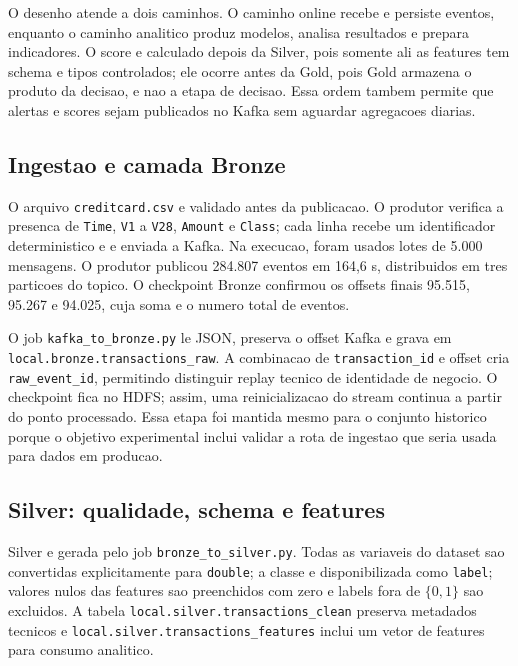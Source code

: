 \documentclass[10pt,twocolumn]{article}
\begin{document}
O desenho atende a dois caminhos. O caminho online recebe e persiste eventos, enquanto o caminho analitico produz modelos, analisa resultados e prepara indicadores. O score e calculado depois da Silver, pois somente ali as features tem schema e tipos controlados; ele ocorre antes da Gold, pois Gold armazena o produto da decisao, e nao a etapa de decisao. Essa ordem tambem permite que alertas e scores sejam publicados no Kafka sem aguardar agregacoes diarias.

\subsection{Ingestao e camada Bronze}

O arquivo \texttt{creditcard.csv} e validado antes da publicacao. O produtor verifica a presenca de \texttt{Time}, \texttt{V1} a \texttt{V28}, \texttt{Amount} e \texttt{Class}; cada linha recebe um identificador deterministico e e enviada a Kafka. Na execucao, foram usados lotes de 5.000 mensagens. O produtor publicou 284.807 eventos em 164,6 s, distribuidos em tres particoes do topico. O checkpoint Bronze confirmou os offsets finais 95.515, 95.267 e 94.025, cuja soma e o numero total de eventos.

O job \texttt{kafka\_to\_bronze.py} le JSON, preserva o offset Kafka e grava em \texttt{local.bronze.transactions\_raw}. A combinacao de \texttt{transaction\_id} e offset cria \texttt{raw\_event\_id}, permitindo distinguir replay tecnico de identidade de negocio. O checkpoint fica no HDFS; assim, uma reinicializacao do stream continua a partir do ponto processado. Essa etapa foi mantida mesmo para o conjunto historico porque o objetivo experimental inclui validar a rota de ingestao que seria usada para dados em producao.

\subsection{Silver: qualidade, schema e features}

Silver e gerada pelo job \texttt{bronze\_to\_silver.py}. Todas as variaveis do dataset sao convertidas explicitamente para \texttt{double}; a classe e disponibilizada como \texttt{label}; valores nulos das features sao preenchidos com zero e labels fora de $\{0,1\}$ sao excluidos. A tabela \texttt{local.silver.transactions\_clean} preserva metadados tecnicos e \texttt{local.silver.transactions\_features} inclui um vetor de features para consumo analitico.
\end{document}
